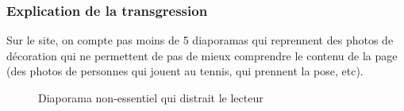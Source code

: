 \documentclass{article}[12pt]
\begin{document}
    	    \subsubsection*{Explication de la transgression}
    	       Sur le site, on compte pas moins de 5 diaporamas qui reprennent des photos de décoration qui ne permettent de pas de mieux comprendre le contenu de la page (des photos de personnes qui jouent au tennis, qui prennent la pose, etc). 
    	       \begin{figure}[H]
    	       	\centering
    	       	\caption{Diaporama non-essentiel qui distrait le lecteur}
    	       \end{figure}
\end{document}
